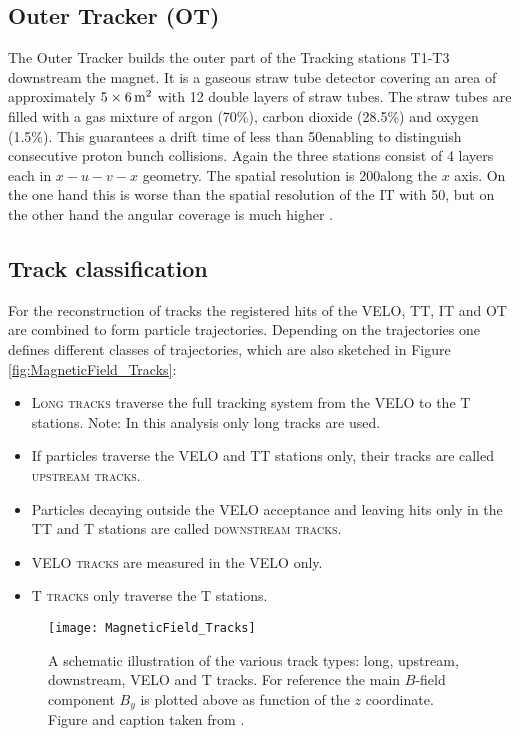 \subsection{Outer Tracker (OT)}
The Outer Tracker builds the outer part of the Tracking stations T1-T3 downstream the magnet.
It is a gaseous straw tube detector covering an area of approximately $5 \times 6 {\rm \,m}^2$ with 12 double layers of straw tubes.
The straw tubes are filled with a gas mixture of argon (70\%), carbon dioxide (28.5\%) and oxygen (1.5\%).
This guarantees a drift time of less than 50\ns enabling to distinguish consecutive proton bunch collisions.
Again the three stations consist of 4 layers each in $x-u-v-x$ geometry.
The spatial resolution is 200\mum along the $x$ axis.
On the one hand this is worse than the spatial resolution of the IT with 50\mum, but on the other hand the angular coverage is much higher \cite{OT_Performance}.

\subsection{Track classification}
For the reconstruction of tracks the registered hits of the VELO, TT, IT and OT are combined to form particle trajectories.
Depending on the trajectories one defines different classes of trajectories, which are also sketched in Figure \ref{fig:MagneticField_Tracks}:
\begin{itemize}
    \item \textsc{Long tracks} traverse the full tracking system from the VELO to the T stations.
          Note: In this analysis only long tracks are used.
    \item If particles traverse the VELO and TT stations only, their tracks are called \textsc{upstream tracks}.
    \item Particles decaying outside the VELO acceptance and leaving hits only in the TT and T stations are called \textsc{downstream tracks}.
    \item \textsc{VELO tracks} are measured in the VELO only.
    \item \textsc{T tracks} only traverse the T stations.
\end{itemize}
\begin{figure}[hptb]
    \centering
	\texttt{[image: MagneticField\_Tracks]}	
	\caption{A schematic illustration of the various track types: long, upstream, downstream, VELO and T tracks.
             For reference the main $B$-field component $B_y$ is plotted above as function of the $z$ coordinate.
             Figure and caption taken from \cite{LHCb_Reoptimization}.}
	\label{fig:IT_layer}
\end{figure}

